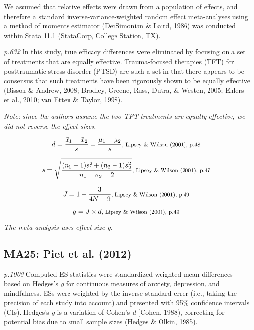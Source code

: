 \documentclass{article}
\begin{document}
We assumed that relative effects were drawn from a population of effects, and therefore a standard inverse-variance-weighted random effect meta-analyses using a method of moments estimator (DerSimonian \& Laird, 1986) was conducted within Stata 11.1 (StataCorp, College Station, TX).

\textit{p.632} In this study, true efficacy differences were eliminated by focusing on a set of treatments that are equally effective. Trauma-focused therapies (TFT) for posttraumatic stress disorder (PTSD) are such a set in that there appears to be consensus that such treatments have been rigorously shown to be equally effective (Bisson \& Andrew, 2008; Bradley, Greene, Russ, Dutra, \& Westen, 2005; Ehlers et al., 2010; van Etten \& Taylor, 1998).

\vspace{3 mm}
\textit{Note: since the authors assume the two TFT treatments are equally effective, we did not reverse the effect sizes.}

\begin{equation*}
d={\frac {{\bar {x}}_{1}-{\bar {x}}_{2}}{s}}={\frac {\mu_{1}-\mu_{2}}{s}}  \mbox {\footnotesize, Lipsey \& Wilson (2001), p.48 } 
\end{equation*}

\begin{equation*}
s={\sqrt {\frac {(n_{1}-1)s_{1}^{2}+(n_{2}-1)s_{2}^{2}}{n_{1}+n_{2}-2}}} \mbox{\footnotesize,  Lipsey \& Wilson (2001), p.47 } 
\end{equation*}

\begin{equation*}
J={1-{\frac {3}{4N-9}}} \mbox {\footnotesize, Lipsey \& Wilson (2001), p.49 }
\end{equation*} 

\begin{equation*}
g=J \times d \mbox{\footnotesize,  Lipsey \& Wilson (2001), p.49 } 
\end{equation*}

\vspace{3mm}
\textit{The meta-analysis uses effect size g.}

\subsection*{MA25: Piet et al. (2012)}

\textit{p.1009} Computed ES statistics were standardized weighted mean differences based on Hedges’s \textit{g} for continuous measures of anxiety, depression, and mindfulness. ESs were weighted by the inverse standard error (i.e., taking the precision of each study into account) and presented with 95\% confidence intervals (CIs). Hedges’s \textit{g} is a variation of Cohen’s \textit{d} (Cohen, 1988), correcting for potential bias due to small sample sizes (Hedges \& Olkin, 1985).
\end{document}
